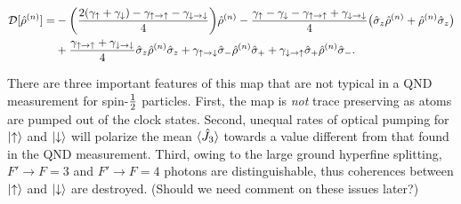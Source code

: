 \documentclass[preprint,aps,pra,onecolumn]{revtex4-1} %
\newcommand{\jz}{\hat{J}_3}
\newcommand{\gammauu}{\gamma_{\uparrow \rightarrow \uparrow}}
\newcommand{\gammadd}{\gamma_{\downarrow \rightarrow \downarrow}}
\newcommand{\gammaud}{\gamma_{\uparrow \rightarrow \downarrow}}
\newcommand{\gammadu}{\gamma_{\downarrow \rightarrow \uparrow}}
\newcommand{\gammau}{\gamma_{\uparrow}}
\newcommand{\gammad}{\gamma_{\downarrow}}
\newcommand{\gammap}{\tilde{\gamma}_\uparrow + \tilde{\gamma}_\downarrow}
\newcommand{\gammam}{\tilde{\gamma}_\uparrow - \tilde{\gamma}_\downarrow}
\newcommand{\half}{\smallfrac{1}{2}}
\newcommand{\lrate}{\Gamma_{\rm loss}}
\newcommand{\prate}{\Gamma_{\rm pol}}
\newcommand{\comment}[1]{{\color{Maroon} #1}}
\begin{document}
	\begin{align} \label{Eq::OpticalPumpingMapSchr}
		\mathcal{D}[\hat{\rho}^{(n)}] %
		=& - \bigg( \frac{2(\gammau+ \gammad) - \gammauu - \gammadd}{4} \bigg) \hat{\rho}^{(n)} - \frac{ \gammau - \gammad - \gammauu + \gammadd }{4} \big( \hat{\sigma}_z \hat{\rho}^{(n)} + \hat{\rho}^{(n)} \hat{\sigma}_z \big) \nn \\
		&+ \frac{\gammauu+\gammadd}{4} \hat{\sigma}_z \hat{\rho}^{(n)} \hat{\sigma}_z + \gammaud  \hat{\sigma}_- \hat{\rho}^{(n)} \hat{\sigma}_+ + \gammadu  \hat{\sigma}_+ \hat{\rho}^{(n)} \hat{\sigma}_- .   
	\end{align} 
	
There are three important features of this map that are not typical in a QND measurement for spin-$\half$ particles.  First, the map is {\em not} trace preserving as atoms are pumped out of the clock states. Second, unequal rates of optical pumping for $\lvert{\uparrow}\rangle$ and $\lvert{\downarrow}\rangle$ will polarize the mean $\expt{\jz}$ towards a value different from that found in the QND measurement. Third, owing to the large ground hyperfine splitting, $F' \rightarrow F=3$ and $F' \rightarrow F=4$ photons are distinguishable, thus coherences between $\lvert{\uparrow}\rangle$ and $\lvert{\downarrow}\rangle$ are destroyed. \comment{(Should we need comment on these issues  later?)}
\end{document}
